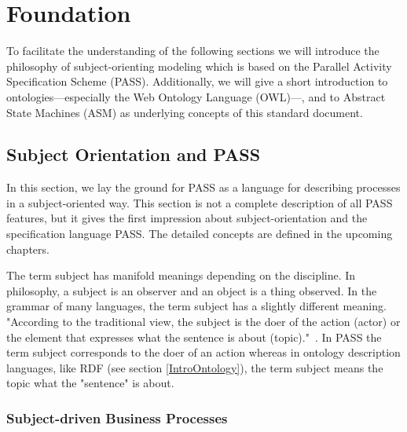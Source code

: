 

\chapter{Foundation}
To facilitate the understanding of the following sections we will introduce the philosophy of subject-orienting modeling which is based on the Parallel Activity Specification Scheme (PASS). Additionally, we will give a short introduction to ontologies---especially the Web Ontology Language (OWL)---, and to Abstract State Machines (ASM) as underlying concepts of this standard document.

\section{Subject Orientation and PASS }
\label{SubjectOrient}


In this section, we lay the ground for PASS as a language for describing processes in a subject-oriented way. This section is not a complete description of all PASS features, but it gives the first impression about subject-orientation and the specification language PASS. The detailed concepts are defined in the upcoming chapters.

The term subject has manifold meanings depending on the discipline. In philosophy, a subject is an observer and an object is a thing observed. In the grammar of many languages, the term subject has a slightly different meaning. "According to the traditional view, the subject is the doer of the action (actor) or the element that expresses what the sentence is about (topic)."~\cite{Keenan:1976aa}. In PASS the term subject corresponds to the doer of an action whereas in ontology description languages, like RDF (see section \ref{IntroOntology}), the term subject means the topic what the "sentence" is about.

\subsection{Subject-driven Business Processes}

